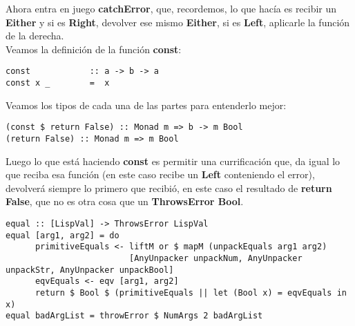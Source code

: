 Ahora entra en juego \textbf{catchError}, que, recordemos, lo que hac\'ia es recibir un \textbf{Either} y si es \textbf{Right}, devolver ese mismo \textbf{Either}, si es \textbf{Left}, aplicarle la funci\'on de la derecha.\\

Veamos la definici\'on de la funci\'on \textbf{const}:\\

\begin{minipage}{\linewidth}
\begin{footnotesize}
\begin{lstlisting}[frame=single]
const            :: a -> b -> a
const x _        =  x
\end{lstlisting}
\end{footnotesize}
\end{minipage}

Veamos los tipos de cada una de las partes para entenderlo mejor:\\

\begin{minipage}{\linewidth}
\begin{footnotesize}
\begin{lstlisting}[frame=single]
(const $ return False) :: Monad m => b -> m Bool
(return False) :: Monad m => m Bool
\end{lstlisting}
\end{footnotesize}
\end{minipage}

Luego lo que est\'a haciendo \textbf{const} es permitir una currificaci\'on que, da igual lo que reciba esa funci\'on (en este caso recibe un \textbf{Left} conteniendo el error), devolver\'a siempre lo primero que recibi\'o, en este caso el resultado de \textbf{return False}, que no es otra cosa que un \textbf{ThrowsError Bool}.

\begin{minipage}{\linewidth}
\begin{tiny}
\begin{lstlisting}[frame=single]
equal :: [LispVal] -> ThrowsError LispVal
equal [arg1, arg2] = do
      primitiveEquals <- liftM or $ mapM (unpackEquals arg1 arg2) 
                         [AnyUnpacker unpackNum, AnyUnpacker unpackStr, AnyUnpacker unpackBool]
      eqvEquals <- eqv [arg1, arg2]
      return $ Bool $ (primitiveEquals || let (Bool x) = eqvEquals in x)
equal badArgList = throwError $ NumArgs 2 badArgList
\end{lstlisting}
\end{tiny}
\end{minipage}

